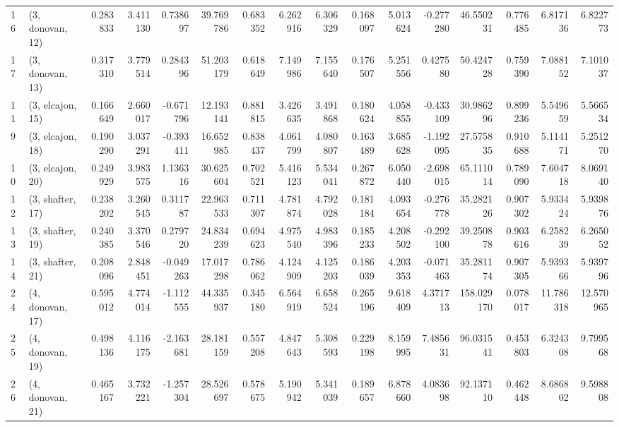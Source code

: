 \begin{tabular}{llrrrrrrrrrrrrrr}
16 &  (3, donovan, 12) &   0.283833 &  3.411130 &  0.738697 &  39.769786 &  0.683352 &   6.262916 &  6.306329 &  0.168097 &  5.013624 & -0.277280 &   46.550231 &  0.776485 &   6.817136 &   6.822773 \\
17 &  (3, donovan, 13) &   0.317310 &  3.779514 &  0.284396 &  51.203179 &  0.618649 &   7.149986 &  7.155640 &  0.176507 &  5.251556 &  0.427580 &   50.424728 &  0.759390 &   7.088152 &   7.101037 \\
11 &  (3, elcajon, 15) &   0.166649 &  2.660017 & -0.671796 &  12.193141 &  0.881815 &   3.426635 &  3.491868 &  0.180624 &  4.058855 & -0.433109 &   30.986296 &  0.899236 &   5.549659 &   5.566534 \\
9  &  (3, elcajon, 18) &   0.190290 &  3.037291 & -0.393411 &  16.652985 &  0.838437 &   4.061799 &  4.080807 &  0.163489 &  3.685628 & -1.192095 &   27.575835 &  0.910688 &   5.114171 &   5.251270 \\
10 &  (3, elcajon, 20) &   0.249929 &  3.983575 &  1.136316 &  30.625604 &  0.702521 &   5.416123 &  5.534041 &  0.267872 &  6.050440 & -2.698015 &   65.111014 &  0.789090 &   7.604718 &   8.069140 \\
12 &  (3, shafter, 17) &   0.238202 &  3.260545 &  0.311787 &  22.963533 &  0.711307 &   4.781874 &  4.792028 &  0.181184 &  4.093654 & -0.276778 &   35.282126 &  0.907302 &   5.933424 &   5.939876 \\
13 &  (3, shafter, 19) &   0.240385 &  3.370546 &  0.279720 &  24.834239 &  0.694623 &   4.975540 &  4.983396 &  0.185233 &  4.208502 & -0.292100 &   39.250878 &  0.903616 &   6.258239 &   6.265052 \\
14 &  (3, shafter, 21) &   0.208096 &  2.848451 & -0.049263 &  17.017298 &  0.786062 &   4.124909 &  4.125203 &  0.186039 &  4.203353 & -0.071463 &   35.281174 &  0.907305 &   5.939366 &   5.939796 \\
24 &  (4, donovan, 17) &   0.595012 &  4.774014 & -1.112555 &  44.335937 &  0.345180 &   6.564919 &  6.658524 &  0.265196 &  9.618409 &  4.371713 &  158.029170 &  0.078017 &  11.786318 &  12.570965 \\
25 &  (4, donovan, 19) &   0.498136 &  4.116175 & -2.163681 &  28.181159 &  0.557208 &   4.847643 &  5.308593 &  0.229198 &  8.159995 &  7.485631 &   96.031541 &  0.453803 &   6.324308 &   9.799568 \\
26 &  (4, donovan, 21) &   0.465167 &  3.732221 & -1.257304 &  28.526697 &  0.578675 &   5.190942 &  5.341039 &  0.189657 &  6.878660 &  4.083698 &   92.137110 &  0.462448 &   8.686802 &   9.598808 \\

\end{tabular}
